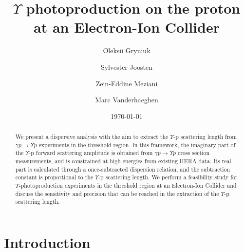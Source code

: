 \documentclass[prd,amsmath,%
twocolumn,floatfix,amssymb, preprintnumbers, nofootinbib, superscriptaddress]{revtex4}
\begin{document}
\title{$\Upsilon$ photoproduction on the proton at an Electron-Ion Collider}
\author{Oleksii Gryniuk}
\author{Sylvester Joosten}
\author{Zein-Eddine Meziani}
\author{Marc Vanderhaeghen}
\noaffiliation
\date{\today}

\begin{abstract}

We present a dispersive analysis with the aim to extract the $\Upsilon$-p scattering length from $\gamma p \to \Upsilon p$ experiments in the threshold region. In this framework, the imaginary part of the $\Upsilon$-p forward scattering amplitude is obtained from $\gamma p \to \Upsilon p$ cross section measurements, and is constrained at high energies from existing HERA data. Its real part is calculated through a once-subtracted dispersion relation, and    
the subtraction constant is proportional to the $\Upsilon$-p scattering length. We perform a feasibility study for $\Upsilon$-photoproduction experiments in the threshold region at an Electron-Ion Collider and discuss the sensitivity and precision that can be reached in the extraction of the $\Upsilon$-p scattering length. 

\end{abstract}

\maketitle



\section{Introduction}
\end{document}

